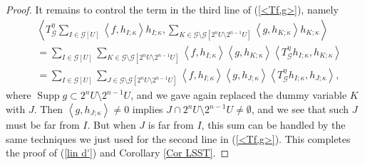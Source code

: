 \documentclass[10pt,a4paper]{amsart}
\begin{document}
\begin{proof}
It remains to control the term in the third line of (\ref{<Tf,g>}), namely%
\begin{align*}
& \left\langle T_{\mathcal{G}}^{\eta}\sum_{I\in\mathcal{G}\left[  U\right]
}\left\langle f,h_{I;\kappa}\right\rangle h_{I;\kappa},\sum_{K\in
\mathcal{G}\setminus\mathcal{G}\left[  2^{n}U\setminus2^{n-1}U\right]
}\left\langle g,h_{K;\kappa}\right\rangle h_{K;\kappa}\right\rangle \\
& =\sum_{I\in\mathcal{G}\left[  U\right]  }\sum_{K\in\mathcal{G}%
\setminus\mathcal{G}\left[  2^{n}U\setminus2^{n-1}U\right]  }\left\langle
f,h_{I;\kappa}\right\rangle \left\langle g,h_{K;\kappa}\right\rangle
\left\langle T_{\mathcal{G}}^{\eta}h_{I;\kappa},h_{K;\kappa}\right\rangle \\
& =\sum_{I\in\mathcal{G}\left[  U\right]  }\sum_{J\in\mathcal{G}%
\setminus\mathcal{G}\left[  2^{n}U\setminus2^{n-1}U\right]  }\left\langle
f,h_{I;\kappa}\right\rangle \left\langle g,h_{J;\kappa}\right\rangle
\left\langle T_{\mathcal{G}}^{\eta}h_{I;\kappa},h_{J;\kappa}\right\rangle ,
\end{align*}
where $\operatorname*{Supp}g\subset2^{n}U\setminus2^{n-1}U$, and we gave again
replaced the dummy variable $K$ with $J$. Then $\left\langle g,h_{J;\kappa
}\right\rangle \neq0$ implies $J\cap2^{n}U\setminus2^{n-1}U\neq\emptyset$, and
we see that such $J\,$must be far from $I$. But when $J$ is far from $I$, this
sum can be handled by the same techniques we just used for the second line in
(\ref{<Tf,g>}). This completes the proof of (\ref{lin d'}) and Corollary
\ref{Cor LSST}.
\end{proof}
\end{document}
